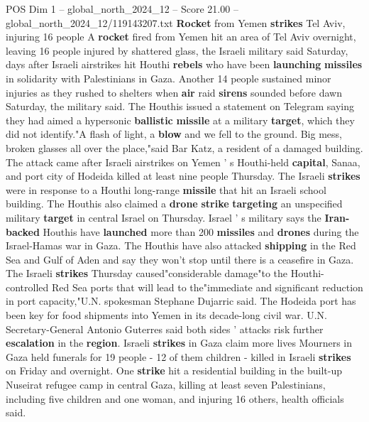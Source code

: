 \begin{textsample}{POS Dim 1 – global\_north\_2024\_12 – Score 21.00 – global\_north\_2024\_12/119143207.txt}  \label{ex:f1_pos_264}
\textbf{Rocket} from Yemen \textbf{strikes} Tel Aviv, injuring 16 people A \textbf{rocket} fired from Yemen hit an area of Tel Aviv overnight, leaving 16 people injured by shattered glass, the Israeli military said Saturday, days after Israeli airstrikes hit Houthi \textbf{rebels} who have been \textbf{launching} \textbf{missiles} in solidarity with Palestinians in Gaza.
Another 14 people sustained minor injuries as they rushed to shelters when \textbf{air} raid \textbf{sirens} sounded before dawn Saturday, the military said.
The Houthis issued a statement on Telegram saying they had aimed a hypersonic \textbf{ballistic} \textbf{missile} at a military \textbf{target}, which they did not identify."A flash of light, a \textbf{blow} and we fell to the ground.
Big mess, broken glasses all over the place,"said Bar Katz, a resident of a damaged building.
The attack came after Israeli airstrikes on Yemen ' s Houthi-held \textbf{capital}, Sanaa, and port city of Hodeida killed at least nine people Thursday.
The Israeli \textbf{strikes} were in response to a Houthi long-range \textbf{missile} that hit an Israeli school building.
The Houthis also claimed a \textbf{drone} \textbf{strike} \textbf{targeting} an unspecified military \textbf{target} in central Israel on Thursday.
Israel ' s military says the \textbf{Iran-backed} Houthis have \textbf{launched} more than 200 \textbf{missiles} and \textbf{drones} during the Israel-Hamas war in Gaza.
The Houthis have also attacked \textbf{shipping} in the Red Sea and Gulf of Aden and say they won't stop until there is a ceasefire in Gaza.
The Israeli \textbf{strikes} Thursday caused"considerable damage"to the Houthi-controlled Red Sea ports that will lead to the"immediate and significant reduction in port capacity,"U.N. spokesman Stephane Dujarric said.
The Hodeida port has been key for food shipments into Yemen in its decade-long civil war.
U.N.
Secretary-General Antonio Guterres said both sides ' attacks risk further \textbf{escalation} in the \textbf{region}.
Israeli \textbf{strikes} in Gaza claim more lives Mourners in Gaza held funerals for 19 people - 12 of them children - killed in Israeli \textbf{strikes} on Friday and overnight.
One \textbf{strike} hit a residential building in the built-up Nuseirat refugee camp in central Gaza, killing at least seven Palestinians, including five children and one woman, and injuring 16 others, health officials said.

\end{textsample}
